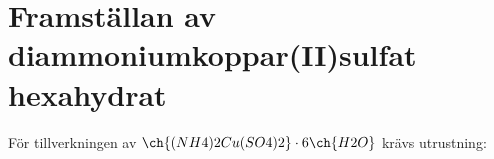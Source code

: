 \documentclass[./chem_exercises.tex]{subfiles}
\begin{document}



\section{Framställan av diammoniumkoppar(II)sulfat hexahydrat}
För tillverkningen av $\ch{(NH4)2Cu(SO4)2}\cdot 6\ch{H2O}$ krävs
utrustning:\\
\end{document}

